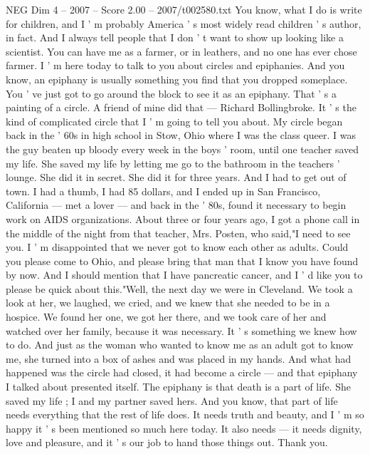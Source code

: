 \begin{textsample}{NEG Dim 4 – 2007 – Score 2.00 – 2007/t002580.txt}  \label{ex:f4_neg_066}
You know, what I do is write for children, and I ' m probably America ' s most widely read children ' s author, in fact.
And I always tell people that I don ' t want to show up looking like a scientist.
You can have me as a farmer, or in leathers, and no one has ever chose farmer.
I ' m here today to talk to you about circles and epiphanies.
And you know, an epiphany is usually something you find that you dropped someplace.
You ' ve just got to go around the block to see it as an epiphany.
That ' s a painting of a circle.
A friend of mine did that — Richard Bollingbroke.
It ' s the kind of complicated circle that I ' m going to tell you about.
My circle began back in the ' 60s in high school in Stow, Ohio where I was the class queer.
I was the guy beaten up bloody every week in the boys ' room, until one teacher saved my life.
She saved my life by letting me go to the bathroom in the teachers ' lounge.
She did it in secret.
She did it for three years.
And I had to get out of town.
I had a thumb, I had 85 dollars, and I ended up in San Francisco, California — met a lover — and back in the ' 80s, found it necessary to begin work on AIDS organizations.
About three or four years ago, I got a phone call in the middle of the night from that teacher, Mrs.
Posten, who said,"I need to see you.
I ' m disappointed that we never got to know each other as adults.
Could you please come to Ohio, and please bring that man that I know you have found by now.
And I should mention that I have pancreatic cancer, and I ' d like you to please be quick about this."Well, the next day we were in Cleveland.
We took a look at her, we laughed, we cried, and we knew that she needed to be in a hospice.
We found her one, we got her there, and we took care of her and watched over her family, because it was necessary.
It ' s something we knew how to do.
And just as the woman who wanted to know me as an adult got to know me, she turned into a box of ashes and was placed in my hands.
And what had happened was the circle had closed, it had become a circle — and that epiphany I talked about presented itself.
The epiphany is that death is a part of life.
She saved my life ; I and my partner saved hers.
And you know, that part of life needs everything that the rest of life does.
It needs truth and beauty, and I ' m so happy it ' s been mentioned so much here today.
It also needs — it needs dignity, love and pleasure, and it ' s our job to hand those things out.
Thank you.

\end{textsample}

